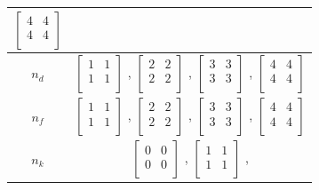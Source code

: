 \begin{table}[h]
\begin{tabular}{c|c}
							$ \begin{bmatrix}	4	&	4	\\	4	&	4	\\	\end{bmatrix} $		\\ \midrule
		$n_d$			&
							$ \begin{bmatrix}	1	&	1	\\	1	&	1	\\	\end{bmatrix} $	,		
							$ \begin{bmatrix}	2	&	2	\\	2	&	2	\\	\end{bmatrix} $	,		
							$ \begin{bmatrix}	3	&	3	\\	3	&	3	\\	\end{bmatrix} $	,		
							$ \begin{bmatrix}	4	&	4	\\	4	&	4	\\	\end{bmatrix} $		\\ \midrule
		$n_f$			&
							$ \begin{bmatrix}	1	&	1	\\	1	&	1	\\	\end{bmatrix} $	,		
							$ \begin{bmatrix}	2	&	2	\\	2	&	2	\\	\end{bmatrix} $	,		
							$ \begin{bmatrix}	3	&	3	\\	3	&	3	\\	\end{bmatrix} $	,		
							$ \begin{bmatrix}	4	&	4	\\	4	&	4	\\	\end{bmatrix} $		\\ \midrule
		$n_k$			&
							$ \begin{bmatrix}	0	&	0	\\	0	&	0	\\	\end{bmatrix} $	,		
							$ \begin{bmatrix}	1	&	1	\\	1	&	1	\\	\end{bmatrix} $	,		

\end{tabular}
\end{table}
